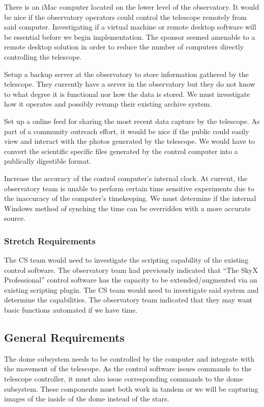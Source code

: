 \documentclass[12pt]{report}
\begin{document}
There is an iMac computer located on the lower level of the observatory. It would be nice if the observatory operators could control the telescope remotely from said computer. Investigating if a virtual machine or remote desktop software will be essential before we begin implementation. The sponsor seemed amenable to a remote desktop solution in order to reduce the number of computers directly controlling the telescope.

Setup a backup server at the observatory to store information gathered by the telescope. They currently have a server in the observatory but they do not know to what degree it is functional nor how the data is stored. We must investigate how it operates and possibly revamp their existing archive system.

Set up a online feed for sharing the most recent data capture by the telescope. As part of a community outreach effort, it would be nice if the public could easily view and interact with the photos generated by the telescope. We would have to convert the scientific specific files generated by the control computer into a publically digestible format.

Increase the accuracy of the control computer’s internal clock. At current, the observatory team is unable to perform certain time sensitive experiments due to the inaccuracy of the computer’s timekeeping. We must determine if the internal Windows method of synching the time can be overridden with a more accurate source.

\subsubsection*{Stretch Requirements}

The CS team would need to investigate the scripting capability of the existing control software. The observatory team had previously indicated that “The SkyX Professional” control software has the capacity to be extended/augmented via an existing scripting plugin. The CS team would need to investigate said system and determine the capabilities. The observatory team indicated that they may want basic functions automated if we have time.

\subsection*{General Requirements}

The dome subsystem needs to be controlled by the computer and integrate with the movement of the telescope. As the control software issues commands to the telescope controller, it must also issue corresponding commands to the dome subsystem. These components must both work in tandem or we will be capturing images of the inside of the dome instead of the stars.
\end{document}

